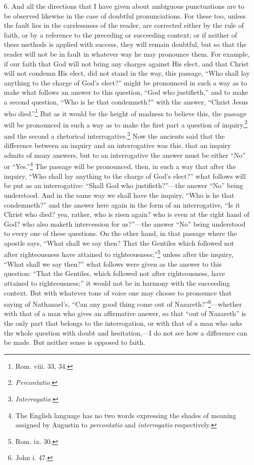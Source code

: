 6. And all the directions that I have given about ambiguous punctuations are to be observed likewise in the case of doubtful pronunciations. For these too, unless the fault lies in the carelessness of the reader, are corrected either by the rule of faith, or by a reference to the preceding or succeeding context; or if neither of these methods is applied with success, they will remain doubtful, but so that the reader will not be in fault in whatever way he may pronounce them. For example, if our faith that God will not bring any charges against His elect, and that Christ will not condemn His elect, did not stand in the way, this passage, “Who shall lay anything to the charge  of God’s elect?” might be pronounced in such a way as to make what follows an answer to this question, “God who justifieth,” and to make a second question, “Who is he that condemneth?” with the answer, “Christ Jesus who died.”\footnote{Rom. viii. 33, 34.} But as it would be the height of madness to believe this, the passage will be pronounced in such a way as to make the first part a question of inquiry,\footnote{\emph{Percontatio.}} and the second a rhetorical interrogative.\footnote{\emph{Interrogatio.}} Now the ancients said that the difference between an inquiry and an interrogative was this, that an inquiry admits of many answers, but to an interrogative the answer must be either “No” or “Yes.”\footnote{The English language has no two words expressing the shades of meaning assigned by Augustin to \emph{ percontatio} and \emph{interrogatio} respectively.} The passage will be pronounced, then, in such a way that after the inquiry, “Who shall lay anything to the charge of God’s elect?” what follows will be put as an interrogative: “Shall God who justifieth?”—the answer “No” being understood. And in the same way we shall have the inquiry, “Who is he that condemneth?” and the answer here again in the form of an interrogative, “Is it Christ who died? yea, rather, who is risen again? who is even at the right hand of God? who also maketh intercession for us?”—the answer “No” being understood to every one of these questions. On the other hand, in that passage where the apostle says, “What shall we say then? That the Gentiles which followed not after righteousness have attained to righteousness;”\footnote{Rom. ix. 30.} unless after the inquiry, “What shall we say then?” what follows were given as the answer to this question: “That the Gentiles, which followed not after righteousness, have attained to righteousness;” it would not be in harmony with the succeeding context. But with whatever tone of voice one may choose to pronounce that saying of Nathanael’s, “Can any good thing come out of Nazareth?”\footnote{John i. 47.}—whether with that of a man who gives an affirmative answer, so that “out of Nazareth” is the only part that belongs to the interrogation, or with that of a man who asks the whole question with doubt and hesitation,—I do not see how a difference can be made. But neither sense is opposed to faith.

